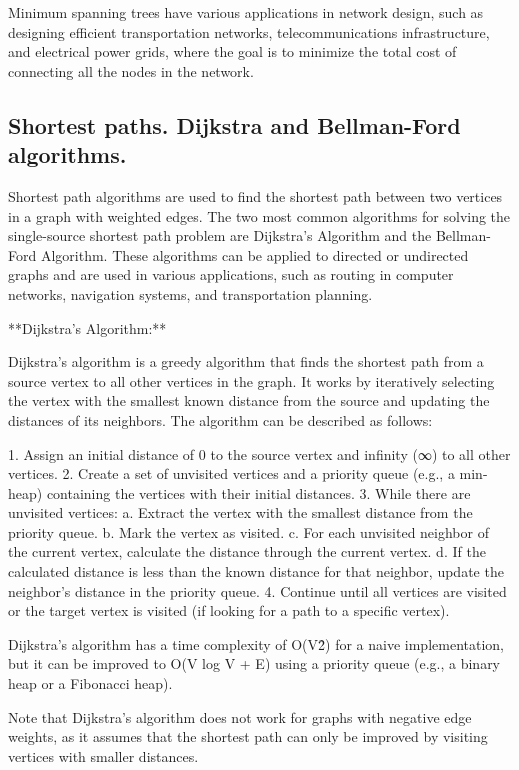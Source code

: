 \documentclass{article}
\begin{document}
Minimum spanning trees have various applications in network design, such as designing efficient transportation networks, telecommunications infrastructure, and electrical power grids, where the goal is to minimize the total cost of connecting all the nodes in the network.


\subsection{Shortest paths. Dijkstra and Bellman-Ford algorithms.}

Shortest path algorithms are used to find the shortest path between two vertices in a graph with weighted edges. The two most common algorithms for solving the single-source shortest path problem are Dijkstra's Algorithm and the Bellman-Ford Algorithm. These algorithms can be applied to directed or undirected graphs and are used in various applications, such as routing in computer networks, navigation systems, and transportation planning.

**Dijkstra's Algorithm:**

Dijkstra's algorithm is a greedy algorithm that finds the shortest path from a source vertex to all other vertices in the graph. It works by iteratively selecting the vertex with the smallest known distance from the source and updating the distances of its neighbors. The algorithm can be described as follows:

1. Assign an initial distance of 0 to the source vertex and infinity (∞) to all other vertices.
2. Create a set of unvisited vertices and a priority queue (e.g., a min-heap) containing the vertices with their initial distances.
3. While there are unvisited vertices:
   a. Extract the vertex with the smallest distance from the priority queue.
   b. Mark the vertex as visited.
   c. For each unvisited neighbor of the current vertex, calculate the distance through the current vertex.
   d. If the calculated distance is less than the known distance for that neighbor, update the neighbor's distance in the priority queue.
4. Continue until all vertices are visited or the target vertex is visited (if looking for a path to a specific vertex).

Dijkstra's algorithm has a time complexity of O(V\^2) for a naive implementation, but it can be improved to O(V log V + E) using a priority queue (e.g., a binary heap or a Fibonacci heap).

Note that Dijkstra's algorithm does not work for graphs with negative edge weights, as it assumes that the shortest path can only be improved by visiting vertices with smaller distances.
\end{document}
